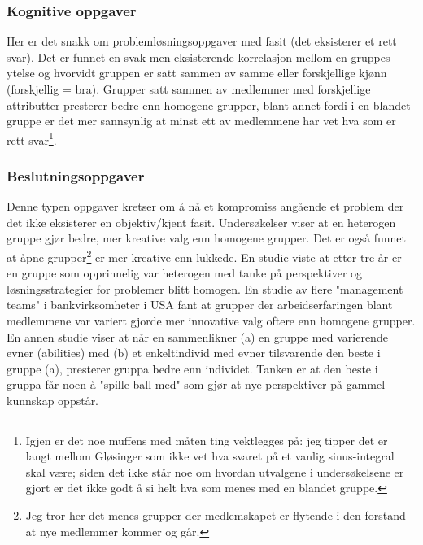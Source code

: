 \documentclass[11pt]{article}
\begin{document}
			\subsubsection{Kognitive oppgaver}
				Her er det snakk om problemløsningsoppgaver med fasit (det eksisterer et rett svar). Det er funnet en svak men eksisterende korrelasjon mellom en gruppes ytelse og hvorvidt gruppen er satt sammen av samme eller forskjellige kjønn (forskjellig = bra). 
				\newline \newline
				Grupper satt sammen av medlemmer med forskjellige attributter presterer bedre enn homogene grupper, blant annet fordi i en blandet gruppe er det mer sannsynlig at minst ett av medlemmene har vet hva som er rett svar\footnote{Igjen er det noe muffens med måten ting vektlegges på: jeg tipper det er langt mellom Gløsinger som ikke vet hva svaret på et vanlig sinus-integral skal være; siden det ikke står noe om hvordan utvalgene i undersøkelsene er gjort er det ikke godt å si helt hva som menes med en blandet gruppe.}. 
				
			\subsubsection{Beslutningsoppgaver}
				Denne typen oppgaver kretser om å nå et kompromiss angående et problem der det ikke eksisterer en objektiv/kjent fasit. Undersøkelser viser at en heterogen gruppe gjør bedre, mer kreative valg enn homogene grupper. Det er også funnet at åpne grupper\footnote{Jeg tror her det menes grupper der medlemskapet er flytende i den forstand at nye medlemmer kommer og går.} er mer kreative enn lukkede. En studie viste at etter tre år er en gruppe som opprinnelig var heterogen med tanke på perspektiver og løsningsstrategier for problemer blitt homogen. 				
				\newline \newline
				En studie av flere "management teams" i bankvirksomheter i USA fant at grupper der arbeidserfaringen blant medlemmene var variert gjorde mer innovative valg oftere enn homogene grupper. En annen studie viser at når en sammenlikner (a) en gruppe med varierende evner (abilities) med (b) et enkeltindivid med evner tilsvarende den beste i gruppe (a), presterer gruppa bedre enn individet. Tanken er at den beste i gruppa får noen å "spille ball med" som gjør at nye perspektiver på gammel kunnskap oppstår. 
				
\end{document}
